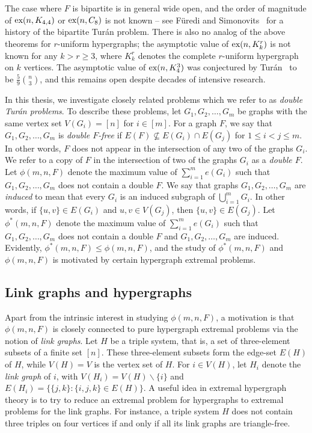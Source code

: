 \documentclass[12pt]{article}
\newcommand*{\ex}{\textnormal{ex}}
\begin{document}
The case where $F$ is bipartite is in general wide open, and the order of magnitude of $\ex(n,K_{4,4})$ or $\ex(n,C_8)$ is not known -- see F\"{u}redi and Simonovits~\cite{FurediSimonovits2013} for a history of the bipartite Tur\'{a}n problem. There is also no analog of the above theorems for $r$-uniform hypergraphs; the asymptotic value of $\ex(n,K_k^r)$ is not known for any $k > r \geq 3$, where $K_k^r$ denotes the complete $r$-uniform hypergraph on $k$ vertices. The asymptotic value of $\ex(n,K_4^3)$ was conjectured by Tur\'{a}n~\cite{Turan1941} to be $\frac{5}{9} \binom{n}{3}$, and this remains open despite decades of intensive research. 

In this thesis, we investigate closely related problems which we refer to as \textit{double Tur\'{a}n problems}. To describe these problems, let $G_1, G_2, \ldots, G_m$ be graphs with the same vertex set $V(G_i) = [n]$ for $i \in [m]$. For a graph $F$, we say that $G_1,G_2,\dots,G_m$ is \textit{double $F$-free} if $E(F) \not \subseteq E(G_i) \cap E(G_j)$ for $1 \leq i < j \leq m$. In other words, $F$ does not appear in the intersection of any two of the graphs $G_i$. We refer to a copy of $F$ in the intersection of two of the graphs $G_i$ as a \textit{double $F$}. Let $\phi(m,n,F)$ denote the maximum value of $\sum_{i = 1}^m e(G_i)$ such that $G_1,G_2,\dots,G_m$ does not contain a double $F$. We say that graphs $G_1,G_2,\dots,G_m$ are \textit{induced} to mean that every $G_i$ is an induced subgraph of $\bigcup_{i = 1}^m G_i$. In other words, if $\{u,v\} \in E(G_i)$ and $u,v \in V(G_j)$, then $\{u,v\} \in E(G_j)$. Let $\phi^*(m,n,F)$ denote the maximum value of $\sum_{i = 1}^m e(G_i)$ such that $G_1,G_2,\dots,G_m$ does not contain a double $F$ and $G_1,G_2,\dots,G_m$ are induced. Evidently, $\phi^*(m,n,F) \leq \phi(m,n,F)$, and the study of $\phi^*(m,n,F)$ and $\phi(m,n,F)$ is motivated by certain hypergraph extremal problems.

\subsection{Link graphs and hypergraphs}

Apart from the intrinsic interest in studying $\phi(m,n,F)$, a motivation is that $\phi(m,n,F)$ is closely connected to pure hypergraph extremal problems via the notion of \textit{link graphs}. Let $H$ be a triple system, that is, a set of three-element subsets of a finite set $[n]$. These three-element subsets form the edge-set $E(H)$ of $H$, while $V(H) = V$ is the vertex set of $H$. For $i \in V(H)$, let $H_i$ denote the \textit{link graph} of $i$, with $V(H_i) = V(H) \backslash \{i\}$ and $E(H_i) = \{\{j,k\} : \{i,j,k\} \in E(H)\}$. A useful idea in extremal hypergraph theory is to try to reduce an extremal problem for hypergraphs to extremal problems for the link graphs. For instance, a triple system $H$ does not contain three triples on four vertices if and only if all its link graphs are triangle-free. 
\end{document}
